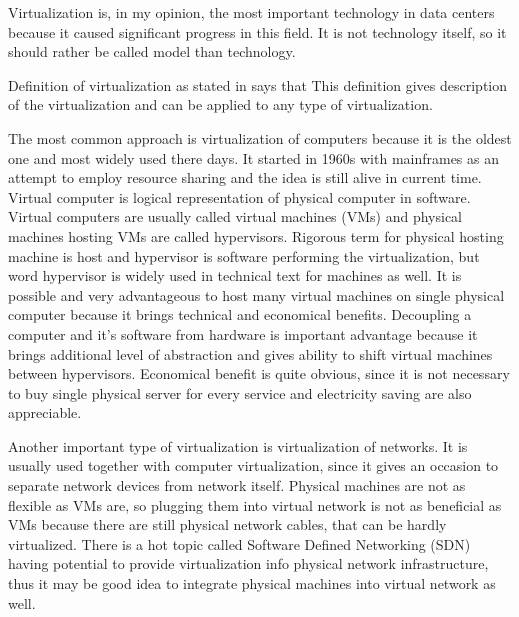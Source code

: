 
Virtualization is, in my opinion, the most important technology in data centers because it caused significant progress in this field. It is not technology itself, so it should rather be called model than technology.

Definition of virtualization as stated in \cite{virtualization-in-education} says that  This definition gives description of the virtualization and can be applied to any type of virtualization.

The most common approach is virtualization of computers because it is the oldest one and most widely used there days. It started in 1960s with mainframes as an attempt to employ resource sharing and the idea is still alive in current time. Virtual computer is logical representation of physical computer in software. \cite{virtualization-in-education} Virtual computers are usually called virtual machines (\Ac{VM}s) and physical machines hosting \Ac{VM}s are called hypervisors. Rigorous term for physical hosting machine is host and hypervisor is software performing the virtualization, but word hypervisor is widely used in technical text for machines as well. It is possible and very advantageous to host many virtual machines on single physical computer because it brings technical and economical benefits. Decoupling a computer and it's software from hardware is important advantage because it brings additional level of abstraction and gives ability to shift virtual machines between hypervisors. Economical benefit is quite obvious, since it is not necessary to buy single physical server for every service and electricity saving are also appreciable.

Another important type of virtualization is virtualization of networks. It is usually used together with computer virtualization, since it gives an occasion to separate network devices from network itself. Physical machines are not as flexible as \Ac{VM}s are, so plugging them into virtual network is not as beneficial as \Ac{VM}s because there are still physical network cables, that can be hardly virtualized. There is a hot topic called Software Defined Networking (\Ac{SDN}) having potential to provide virtualization info physical network infrastructure, thus it may be good idea to integrate physical machines into virtual network as well.

